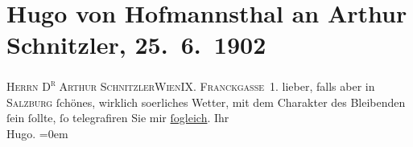 

         
         \renewcommand{\erwaehntePersonen}{Personen: Hugo von Hofmannsthal}
         \renewcommand{\erwaehnteOrte}{Orte: Frankgasse 1, Gainfarn, IX., Alsergrund, Salzburg, Wien}
         \renewcommand{\erwaehnteWerke}{}
               \section[Hugo von Hofmannsthal an Arthur Schnitzler, 25. 6. 1902]{ Hugo von Hofmannsthal an Arthur Schnitzler, 25. 6. 1902}\nopagebreak{}\rehead{ }\begin{ledgroupsized}[t]{13cm}\normalsize\beginnumbering \toendnotes[C]{\smallbreak\pagebreak[2]} 
\pstart{}{\pb}\textsc{Herrn D\textsuperscript{r} Arthur Schnitzler}\pend{}\pstart{}\textsc{Wien}\pend{}\pstart{}\textsc{IX. Franckgasse 1}. \pend{}{\bigskip}\pstart
           \noindent{}{\pb}lieber, falls aber in
                  \textsc{Salzburg} ſchönes, wirklich so{\geminationm}erliches Wetter, mit dem
               Charakter des Bleibenden ſein ſollte, ſo telegrafiren Sie mir \uline{ſogleich}.\pend
           \pstart
           Ihr{\\[\baselineskip]}\spacefill\mbox{Hugo.}\pend
           \leftskip=0em{}
         
         \endnumbering{}\end{ledgroupsized}  \newcommand{\dateiname}{L01224}\newcommand{\titel}{Hugo von Hofmannsthal an Arthur Schnitzler, 25. 6. 1902}\newcommand{\editorInnen}{Martin Anton Müller und Gerd-Hermann Susen}
      